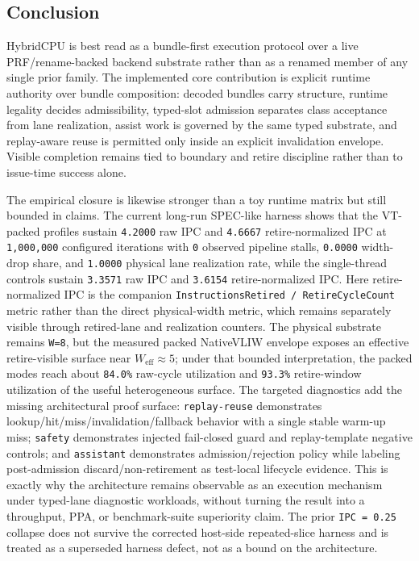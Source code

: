 \documentclass[twocolumn]{article}
\begin{document}
\subsection{Conclusion}

HybridCPU is best read as a bundle-first execution protocol over a live PRF/rename-backed backend substrate rather than as a renamed member of any single prior family. The implemented core contribution is explicit runtime authority over bundle composition: decoded bundles carry structure, runtime legality decides admissibility, typed-slot admission separates class acceptance from lane realization, assist work is governed by the same typed substrate, and replay-aware reuse is permitted only inside an explicit invalidation envelope. Visible completion remains tied to boundary and retire discipline rather than to issue-time success alone.

The empirical closure is likewise stronger than a toy runtime matrix but still bounded in claims. The current long-run SPEC-like harness shows that the VT-packed profiles sustain \texttt{4.2000} raw IPC and \texttt{4.6667} retire-normalized IPC at \texttt{1,000,000} configured iterations with \texttt{0} observed pipeline stalls, \texttt{0.0000} width-drop share, and \texttt{1.0000} physical lane realization rate, while the single-thread controls sustain \texttt{3.3571} raw IPC and \texttt{3.6154} retire-normalized IPC. Here retire-normalized IPC is the companion \texttt{InstructionsRetired / RetireCycleCount} metric rather than the direct physical-width metric, which remains separately visible through retired-lane and realization counters. The physical substrate remains \texttt{W=8}, but the measured packed NativeVLIW envelope exposes an effective retire-visible surface near \(W_{\mathrm{eff}}\approx5\); under that bounded interpretation, the packed modes reach about \texttt{84.0\%} raw-cycle utilization and \texttt{93.3\%} retire-window utilization of the useful heterogeneous surface. The targeted diagnostics add the missing architectural proof surface: \texttt{replay-reuse} demonstrates lookup/hit/miss/invalidation/fallback behavior with a single stable warm-up miss; \texttt{safety} demonstrates injected fail-closed guard and replay-template negative controls; and \texttt{assistant} demonstrates admission/rejection policy while labeling post-admission discard/non-retirement as test-local lifecycle evidence. This is exactly why the architecture remains observable as an execution mechanism under typed-lane diagnostic workloads, without turning the result into a throughput, PPA, or benchmark-suite superiority claim. The prior \texttt{IPC = 0.25} collapse does not survive the corrected host-side repeated-slice harness and is treated as a superseded harness defect, not as a bound on the architecture.
\end{document}
